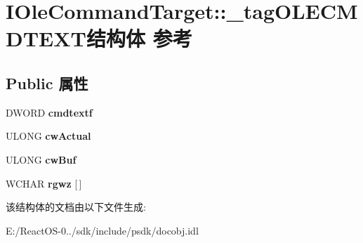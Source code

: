 \hypertarget{struct_i_ole_command_target_1_1__tag_o_l_e_c_m_d_t_e_x_t}{}\section{I\+Ole\+Command\+Target\+:\+:\+\_\+tag\+O\+L\+E\+C\+M\+D\+T\+E\+X\+T结构体 参考}
\label{struct_i_ole_command_target_1_1__tag_o_l_e_c_m_d_t_e_x_t}
\subsection*{Public 属性}
\begin{DoxyCompactItemize}
\item 
\mbox{\label{struct_i_ole_command_target_1_1__tag_o_l_e_c_m_d_t_e_x_t_a75dcba371f5b8a7833c23a793386ba03}} 
D\+W\+O\+RD {\bfseries cmdtextf}
\item 
\mbox{\label{struct_i_ole_command_target_1_1__tag_o_l_e_c_m_d_t_e_x_t_a5b43a68be88b831ccfa8f753ecf5de2f}} 
U\+L\+O\+NG {\bfseries cw\+Actual}
\item 
\mbox{\label{struct_i_ole_command_target_1_1__tag_o_l_e_c_m_d_t_e_x_t_ab03dfc1a34fdeb9ebeee043af93fbc75}} 
U\+L\+O\+NG {\bfseries cw\+Buf}
\item 
\mbox{\label{struct_i_ole_command_target_1_1__tag_o_l_e_c_m_d_t_e_x_t_a324695da745d07261ef2799215f4f849}} 
W\+C\+H\+AR {\bfseries rgwz} \mbox{[}$\,$\mbox{]}
\end{DoxyCompactItemize}


该结构体的文档由以下文件生成\+:\begin{DoxyCompactItemize}
\item 
E\+:/\+React\+O\+S-\/0../sdk/include/psdk/docobj.\+idl\end{DoxyCompactItemize}

